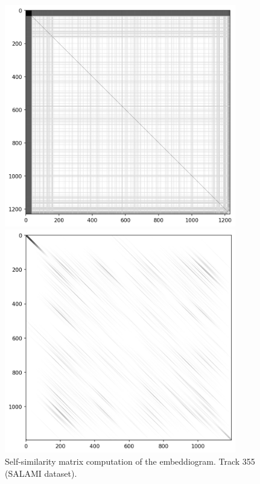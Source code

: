 \begin{figure}[ht]
    \centering
    \begin{minipage}{0.45\textwidth}
        \centering
        \includegraphics[width=0.9\textwidth]{figures/images/355recurrencematrix.png} %
        \caption[Track 355 (SALAMI dataset) Self-similarity matrix]{Self-similarity matrix computation of the embeddiogram. Track 355 (SALAMI dataset).}
        \label{fig:SSM}
    \end{minipage}\hfill
    \begin{minipage}{0.45\textwidth}
        \centering
        \includegraphics[width=0.9\textwidth]{figures/images/355lagmatrixgaussiansmoothing.png} %

\end{minipage}
\end{figure}
